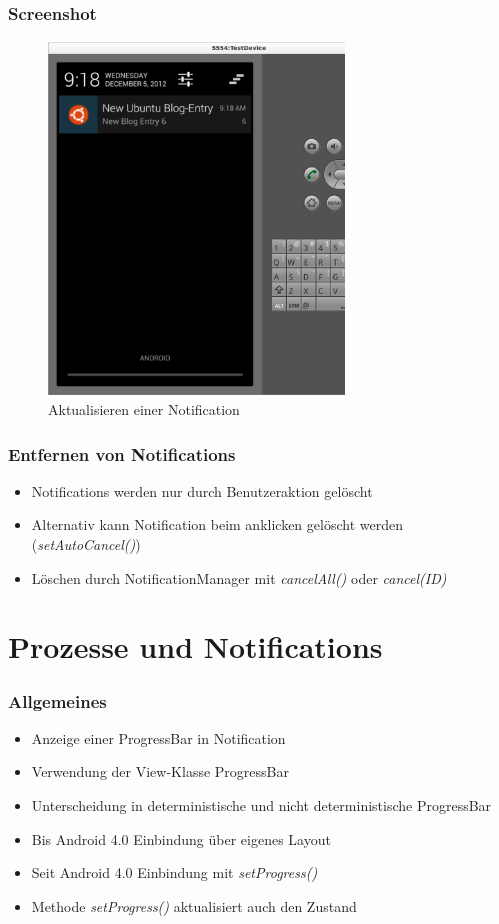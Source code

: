 \begin{frame}
   \frametitle{Screenshot}
   \begin{figure}[h!]
     \centering
     \includegraphics[width=0.7\textwidth]{pictures/updateNotification.ps}
     \caption{
        Aktualisieren einer Notification
     }
     \label{fig:updateNotification}
   \end{figure}
\end{frame}

\begin{frame}
   \frametitle{Entfernen von Notifications}
   \begin{itemize}
      \item Notifications werden nur durch Benutzeraktion gelöscht
      \item Alternativ kann Notification beim anklicken gelöscht werden 
         (\emph{setAutoCancel()})
      \item Löschen durch NotificationManager mit \emph{cancelAll()} oder 
         \emph{cancel(ID)} 
   \end{itemize}
\end{frame}

\section{Prozesse und Notifications}
\begin{frame}
   \frametitle{Allgemeines}
   \begin{itemize}
      \item Anzeige einer ProgressBar in Notification
      \item Verwendung der View-Klasse ProgressBar
      \item Unterscheidung in deterministische und nicht deterministische ProgressBar
      \item Bis Android 4.0 Einbindung über eigenes Layout
      \item Seit Android 4.0 Einbindung mit \emph{setProgress()}
      \item Methode \emph{setProgress()} aktualisiert auch den Zustand
   \end{itemize}
\end{frame}

